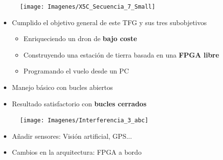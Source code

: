 \documentclass[a4,landscpae]{seminar}
\begin{document}
\begin{hslide}
\begin{center}
	\begin{figure}
		\texttt{[image: Imagenes/X5C\_Secuencia\_7\_Small]}
	\end{figure} \hfill
\end{center}
\end{hslide}



\begin{hslide}
\begin{minipage}{8cm}
	\begin{itemize}
		\item Cumplido el objetivo general de este TFG y sus tres subobjetivos
			\begin{itemize}
				\item Enriqueciendo un dron de \textbf{bajo coste}
				\item Construyendo una estaci\'on de tierra basada en una \textbf{FPGA libre}
				\item Programando el vuelo desde un PC
			\end{itemize}
		\item Manejo b\'asico con bucles abiertos
		\item Resultado satisfactorio con \textbf{bucles cerrados}
	\end{itemize}
\end{minipage} \hfill
\begin{minipage}{2cm}
	\begin{center}
		\begin{figure}
			\texttt{[image: Imagenes/Interferencia\_3\_abc]}
		\end{figure}
	\end{center}
\end{minipage} \hfill
\end{hslide}
\begin{hslide}

\begin{itemize}
	\item A\~nadir sensores: Visi\'on artificial, GPS...
	\item Cambios en la arquitectura: FPGA a bordo
\end{itemize}


\end{hslide}
\end{document}
